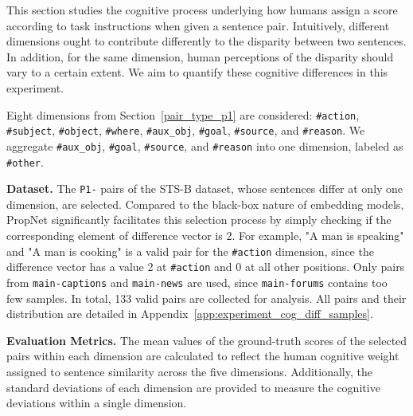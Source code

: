 
This section studies the cognitive process underlying how humans assign a score according to task instructions when given a sentence pair. Intuitively, different dimensions ought to contribute differently to the disparity between two sentences. In addition, for the same dimension, human perceptions of the disparity should vary to a certain extent. We aim to quantify these cognitive differences in this experiment. 

Eight dimensions from Section~\ref{pair_type_p1} are considered: \texttt{\#action}, \texttt{\#subject}, \texttt{\#object}, \texttt{\#where}, \texttt{\#aux\_obj}, \texttt{\#goal}, \texttt{\#source}, and \texttt{\#reason}. We aggregate \texttt{\#aux\_obj}, \texttt{\#goal}, \texttt{\#source}, and \texttt{\#reason} into one dimension, labeled as \texttt{\#other}. 

\textbf{Dataset.} The \texttt{P1-} pairs of the STS-B dataset, whose sentences differ at only one dimension, are selected. Compared to the black-box nature of embedding models, PropNet significantly facilitates this selection process by simply checking if the corresponding element of difference vector is 2. For example, "A man is speaking" and "A man is cooking" is a valid pair for the \texttt{\#action} dimension, since the difference vector has a value 2 at \texttt{\#action} and 0 at all other positions. Only pairs from \texttt{main-captions} and \texttt{main-news} are used, since \texttt{main-forums} contains too few samples. In total, 133 valid pairs are collected for analysis. All pairs and their distribution are detailed in Appendix~\ref{app:experiment_cog_diff_samples}.


\textbf{Evaluation Metrics.} The mean values of the ground-truth scores of the selected pairs within each dimension are calculated to reflect the human cognitive weight assigned to sentence similarity across the five dimensions. Additionally, the standard deviations of each dimension are provided to measure the cognitive deviations within a single dimension. 



